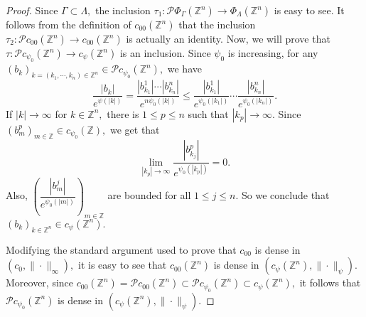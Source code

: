 \documentclass [11pt]{amsart}
\newcommand{\Z}{\mathbb Z}
\newcommand{\ra} {\rightarrow}
\newcommand{\ds} {\displaystyle}
\numberwithin{equation}{section}
\begin{document}
\begin{proof}
Since $\Gamma \subset \Lambda,$ the inclusion $\tau_1: \mathcal{P}\Phi_{\Gamma}(\Z^n) \ra \Phi_{\Lambda}(\Z^n)$ is easy to see. It follows from the definition of $c_{00}(\Z^n)$ that the inclusion $\tau_2: \mathcal{P}c_{00}(\Z^n) \ra c_{00}(\Z^n)$ is actually an identity. Now, we will prove that $\tau : \mathcal{P}c_{\psi_0}(\Z^n) \ra c_{\psi}(\Z^n)$ is an inclusion. Since $\psi_0$ is increasing, for any $(b_k)_{k =(k_1, \cdots, k_n) \in \Z^n}\in \mathcal{P}c_{\psi_0}(\Z^n),$ we have
$$\dfrac{|b_k|}{e^{\psi(|k|)}}=\dfrac{|b^1_{k_1}|\cdots |b^n_{k_n}|}{e^{n\psi_0(|k|)}}\leq \dfrac{|b^1_{k_1}|}{e^{\psi_0(|k_1|)}}\cdots \dfrac{|b^n_{k_n}|}{e^{\psi_0(|k_n|)}}.$$
If $|k|\to \infty$ for $k \in \Z^n,$ there is $1\leq p \leq n$ such that $|k_p|\to \infty.$ Since $(b^p_{m})_{m\in \Z}\in c_{\psi_0}(\Z),$ we get that 
$$\ds{\lim_{|k_p|\to \infty}\dfrac{|b^p_{k_j}|}{e^{\psi_0(|k_p|)}}=0}.$$ Also, $\ds{\left(\dfrac{|b^j_{m}|}{e^{\psi_0(|m|)}}\right)_{m\in \Z}}$ are bounded for all $1\leq j \leq n.$ So we conclude that $(b_k)_{k \in \Z^n}\in c_{\psi}(\Z^n).$

Modifying the standard argument used to prove that $c_{00}$ is dense in $(c_0, \|\cdot\|_\infty),$ it is easy to see that $c_{00}(\Z^n)$ is dense in $(c_{\psi}(\Z^n),\|\cdot \|_{\psi}).$ Moreover, since $c_{00}(\Z^n)=\mathcal{P}c_{00}(\Z^n)\subset \mathcal{P}c_{\psi_0}(\Z^n) \subset c_\psi(\Z^n),$ it follows that $\mathcal{P}c_{\psi_0}(\Z^n)$ is dense in $(c_\psi(\Z^n),\|\cdot\|_\psi).$ 


\end{proof}
\end{document}

